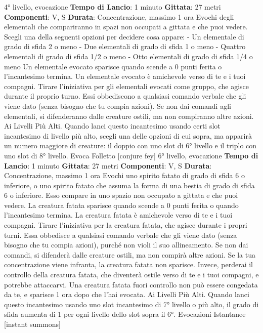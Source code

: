 \begin{multicols}{2}
4° livello, evocazione
\textbf{Tempo di Lancio}: 1 minuto
\textbf{Gittata}: 27 metri
\textbf{Componenti}: V, S
\textbf{Durata}: Concentrazione, massimo 1 ora
Evochi degli elementali che compariranno in spazi non
occupati a gittata e che puoi vedere. Scegli una della
seguenti opzioni per decidere cosa appare:
- Un elementale di grado di sfida 2 o meno
- Due elementali di grado di sfida 1 o meno
- Quattro elementali di grado di sfida 1/2 o meno
- Otto elementali di grado di sfida 1/4 o meno
Un elementale evocato sparisce quando scende a 0
punti ferita o l’incantesimo termina.
Un elementale evocato è amichevole verso di te e i tuoi
compagni. Tirare l’iniziativa per gli elementali evocati
come gruppo, che agisce durante il proprio turno. Essi
obbediscono a qualsiasi comando verbale che gli viene
dato (senza bisogno che tu compia azioni). Se non dai
comandi agli elementali, si difenderanno dalle creature
ostili, ma non compiranno altre azioni.
Ai Livelli Più Alti. Quando lanci questo incantesimo
usando certi slot incantesimo di livello più alto, scegli
una delle opzioni di cui sopra, ma apparirà un numero
maggiore di creature: il doppio con uno slot di 6° livello
e il triplo con uno slot di 8° livello.
Evoca Folletto
[conjure fey]
6° livello, evocazione
\textbf{Tempo di Lancio}: 1 minuto
\textbf{Gittata}: 27 metri
\textbf{Componenti}: V, S
\textbf{Durata}: Concentrazione, massimo 1 ora
Evochi uno spirito fatato di grado di sfida 6 o inferiore, o
uno spirito fatato che assuma la forma di una bestia di
grado di sfida 6 o inferiore. Esso compare in uno spazio
non occupato a gittata e che puoi vedere. La creatura
fatata sparisce quando scende a 0 punti ferita o quando
l’incantesimo termina.
La creatura fatata è amichevole verso di te e i tuoi
compagni. Tirare l’iniziativa per la creatura fatata, che
agisce durante i propri turni. Essa obbedisce a qualsiasi
comando verbale che gli viene dato (senza bisogno che
tu compia azioni), purché non violi il suo allineamento.
Se non dai comandi, si difenderà dalle creature ostili,
ma non compirà altre azioni.
Se la tua concentrazione viene infranta, la creatura
fatata non sparisce. Invece, perderai il controllo della
creatura fatata, che diventerà ostile verso di te e i tuoi
compagni, e potrebbe attaccarvi. Una creatura fatata
fuori controllo non può essere congedata da te, e
sparisce 1 ora dopo che l’hai evocata.
Ai Livelli Più Alti. Quando lanci questo incantesimo
usando uno slot incantesimo di 7° livello o più alto, il
grado di sfida aumenta di 1 per ogni livello dello slot
sopra il 6°.
Evocazioni Istantanee
[instant summons]

\end{multicols}
